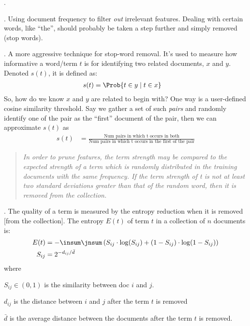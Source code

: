 \documentclass[11pt]{article}
\newcommand\p{\Needspace{10\baselineskip} \noindent}
\begin{document}
\p {}. 
\begin{compactitem}
	\item {}. Using document frequency to filter \textit{out} irrelevant features. Dealing with certain words, like ``the'', should probably be taken a step further and simply removed (stop words). 
	
	\item {}. A more aggressive technique for stop-word removal. It's used to measure how informative a word/term $t$ is for identifying two related documents, $x$ and $y$. Denoted $s(t)$, it is defined as:
	\begin{align}
		s(t) &= \Prob{t \in y \mid t \in x}
	\end{align}
	So, how do we know $x$ and $y$ are related to begin with? One way is a user-defined cosine similarity threshold. Say we gather a set of such \textit{pairs} and randomly identify one of the pair as the ``first'' document of the pair, then we can approximate $s(t)$ as
	\begin{align}
		s(t) &= \frac{ \text{Num pairs in which t occurs in both}   }{ \text{Num pairs in which t occurs in the first of the pair}  }
	\end{align}
	
	\begin{quote}
		\textit{{\small In order to prune features, the term strength may be compared to the expected strength of a term which is randomly distributed in the training documents with the same frequency. If the term strength of t is not at least two standard deviations greater than that of the random word, then it is removed from the collection.}}
	\end{quote}
	
	\item {}. The quality of a term is measured by the entropy reduction when it is removed [from the collection]. The entropy $E(t)$ of term $t$ in a collection of $n$ documents is:
	\begin{align}
		E(t) &= - \insum \jnsum \left( S_{ij} \cdot \log(S_{ij}) 
		+ (1 - S_{ij}) \cdot \log(1 - S_{ij})\right)\\
		S_{ij} &= 2^{-d_{ij} / \bar d }
	\end{align}
	where
	\begin{compactitem}
		\item $S_{ij} \in (0, 1)$ is the similarity between doc $i$ and $j$.
		\item $d_{ij}$ is the distance between $i$ and $j$ after the term $t$ is removed
		\item $\bar d$ is the average distance between the documents after the term $t$ is removed.
	\end{compactitem} 
\end{compactitem}
\end{document}
